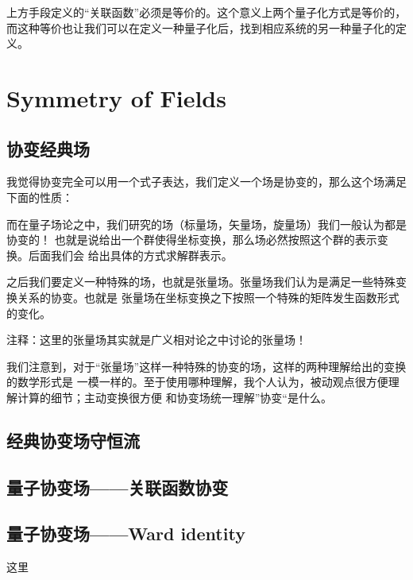 上方手段定义的“关联函数”必须是等价的。这个意义上两个量子化方式是等价的，而这种等价也让我们可以在定义一种量子化后，找到相应系统的另一种量子化的定义。

\newpage


\section{Symmetry of Fields}

\subsection{协变经典场}
我觉得协变完全可以用一个式子表达，我们定义一个场是协变的，那么这个场满足下面的性质：

而在量子场论之中，我们研究的场（标量场，矢量场，旋量场）我们一般认为都是协变的！
也就是说给出一个群使得坐标变换，那么场必然按照这个群的表示变换。后面我们会
给出具体的方式求解群表示。

之后我们要定义一种特殊的场，也就是张量场。张量场我们认为是满足一些特殊变换关系的协变。也就是
张量场在坐标变换之下按照一个特殊的矩阵发生函数形式的变化。

注释：这里的张量场其实就是广义相对论之中讨论的张量场！


我们注意到，对于“张量场”这样一种特殊的协变的场，这样的两种理解给出的变换的数学形式是
一模一样的。至于使用哪种理解，我个人认为，被动观点很方便理解计算的细节；主动变换很方便
和协变场统一理解”协变“是什么。 



\subsection{经典协变场守恒流}



\subsection{量子协变场——关联函数协变}


\subsection{量子协变场——Ward identity}
这里